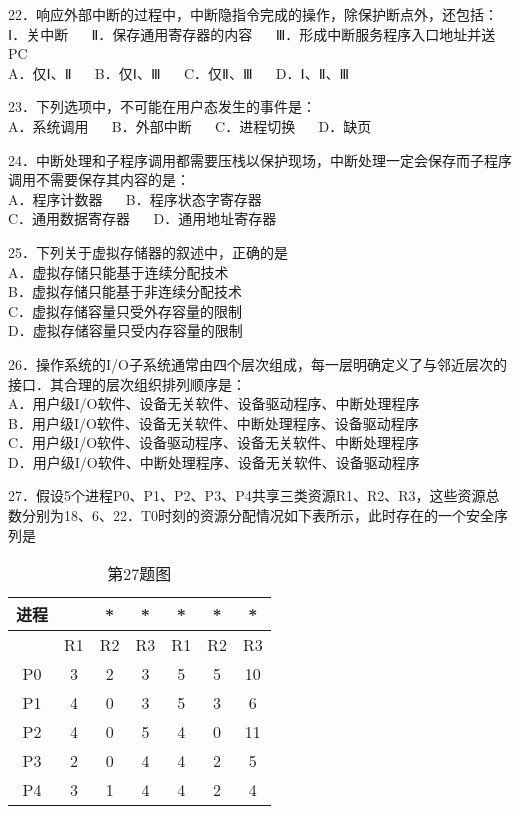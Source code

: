 22．响应外部中断的过程中，中断隐指令完成的操作，除保护断点外，还包括：\\
Ⅰ．关中断 $\quad$ Ⅱ．保存通用寄存器的内容 $\quad$ Ⅲ．形成中断服务程序入口地址并送PC\\
A．仅Ⅰ、Ⅱ $\quad$ B．仅Ⅰ、Ⅲ $\quad$ C．仅Ⅱ、Ⅲ $\quad$ D．Ⅰ、Ⅱ、Ⅲ

23．下列选项中，不可能在用户态发生的事件是：\\
A．系统调用 $\quad$ B．外部中断 $\quad$ C．进程切换 $\quad$ D．缺页

24．中断处理和子程序调用都需要压栈以保护现场，中断处理一定会保存而子程序调用不需要保存其内容的是：\\
A．程序计数器 $\quad$ B．程序状态字寄存器\\
C．通用数据寄存器 $\quad$ D．通用地址寄存器

25．下列关于虚拟存储器的叙述中，正确的是\\
A．虚拟存储只能基于连续分配技术\\
B．虚拟存储只能基于非连续分配技术\\
C．虚拟存储容量只受外存容量的限制\\
D．虚拟存储容量只受内存容量的限制

26．操作系统的I/O子系统通常由四个层次组成，每一层明确定义了与邻近层次的接口．其合理的层次组织排列顺序是：\\
A．用户级I/O软件、设备无关软件、设备驱动程序、中断处理程序\\
B．用户级I/O软件、设备无关软件、中断处理程序、设备驱动程序\\
C．用户级I/O软件、设备驱动程序、设备无关软件、中断处理程序\\
D．用户级I/O软件、中断处理程序、设备无关软件、设备驱动程序

27．假设5个进程P0、P1、P2、P3、P4共享三类资源R1、R2、R3，这些资源总数分别为18、6、22．T0时刻的资源分配情况如下表所示，此时存在的一个安全序列是\\
\begin{table}[ht]
\centering
\caption{第27题图}\label{CSN12_tab1}
\begin{tabular}{|c|c|c|c|c|c|c|}
\hline
 进程 & & * & * & * & * & * \\
\hline
 & R1 & R2 & R3 & R1 & R2 & R3 \\
\hline
P0 & 3 & 2 & 3 & 5 & 5 & 10 \\
\hline
P1 & 4 & 0 & 3 & 5 & 3 & 6 \\
\hline
P2 & 4 & 0 & 5 & 4 & 0 & 11 \\
\hline
P3 & 2 & 0 & 4 & 4 & 2 & 5 \\
\hline
P4 & 3 & 1 & 4 & 4 & 2 & 4 \\
\hline
\end{tabular}
\end{table} \\

